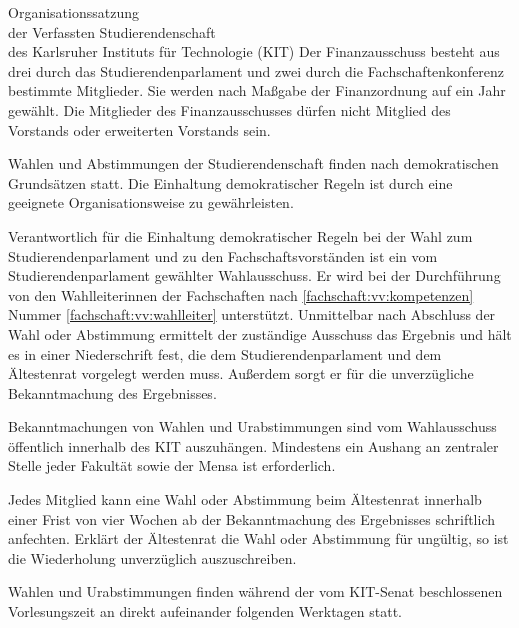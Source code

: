 \begin{jurdoc}[Organisationssatzung]{Organisationssatzung\\der Verfassten Studierendenschaft\\des Karlsruher Instituts für Technologie (KIT)}
Der  Finanzausschuss besteht aus drei durch das Studierendenparlament und  zwei durch die Fachschaftenkonferenz bestimmte Mitglieder. Sie werden nach Maßgabe der Finanzordnung auf ein Jahr gewählt. Die Mitglieder des Finanzausschusses dürfen nicht Mitglied des Vorstands oder erweiterten Vorstands sein. \label{haushalt:finanzausschuss:wahl}


%
%


\label{grundsaetze:wahlen}

Wahlen und Abstimmungen der Studierendenschaft finden nach demokratischen Grundsätzen statt. Die Einhaltung demokratischer Regeln ist durch eine geeignete Organisationsweise zu gewährleisten.

Verantwortlich für die Einhaltung demokratischer Regeln bei der Wahl zum Studierendenparlament und zu den Fachschaftsvorständen ist ein vom Studierendenparlament gewählter Wahlausschuss. Er wird bei der Durchführung von den Wahlleiterinnen der Fachschaften nach \ref{fachschaft:vv:kompetenzen} Nummer \ref{fachschaft:vv:wahlleiter} unterstützt. Unmittelbar nach Abschluss der Wahl oder Abstimmung ermittelt der zuständige Ausschuss das Ergebnis und hält es in einer Niederschrift fest, die dem Studierendenparlament und dem Ältestenrat vorgelegt werden muss. Außerdem sorgt er für die unverzügliche Bekanntmachung des Ergebnisses. \label{grundsaetze:wahlen:wahlausschuss}

Bekanntmachungen von Wahlen und Urabstimmungen sind vom Wahlausschuss öffentlich innerhalb des KIT auszuhängen. Mindestens ein Aushang an zentraler Stelle jeder Fakultät sowie der Mensa ist erforderlich. \label{grundsaetze:wahlen:bekanntmachung}

Jedes Mitglied kann eine Wahl oder Abstimmung beim Ältestenrat innerhalb einer Frist von vier Wochen ab der Bekanntmachung des Ergebnisses schriftlich anfechten. Erklärt der Ältestenrat die Wahl oder Abstimmung für ungültig, so ist die Wiederholung unverzüglich auszuschreiben. \label{grundsaetze:wahlen:wahlanfechtung}

Wahlen und Urabstimmungen finden während der vom KIT-Senat beschlossenen Vorlesungszeit an direkt aufeinander folgenden Werktagen statt.


\end{jurdoc}
